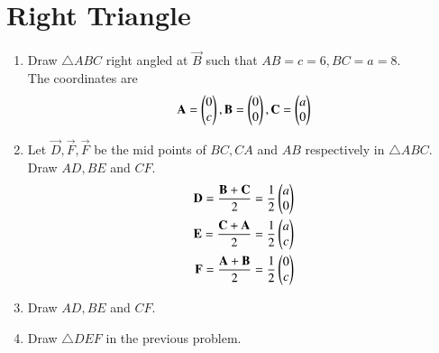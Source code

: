 \documentclass[journal,12pt,twocolumn]{IEEEtran}
\renewcommand\thesection{\arabic{section}}
\begin{document}
\section{Right Triangle}
\begin{enumerate}[label=\thesection.\arabic*
,ref=\thesection.\theenumi]
%
\item Draw $\triangle ABC$  right angled at $\vec{B}$ such that $AB = c =6, BC = a =8$.
\\
\solution The coordinates are
\begin{align}
\label{eq:rt_triang}
\mathbf{A}=\begin{pmatrix}0 \\ c\end{pmatrix}
,
\mathbf{B}=\begin{pmatrix}0 \\ 0\end{pmatrix}
,
\mathbf{C}=\begin{pmatrix}a \\ 0\end{pmatrix}
\end{align}
\item Let $\vec{D}, \vec{F}, \vec{F}$ be the mid points of $BC,CA$ and $AB$ respectively in $\triangle ABC$. Draw $AD,BE$ and $CF$.
\\
\solution 
\begin{align}
\label{eq:rt_triang_mid}
\mathbf{D} = \frac{\mathbf{B}+\mathbf{C}}{2} = \frac{1}{2}\begin{pmatrix}a \\ 0\end{pmatrix}
\\
\mathbf{E} = \frac{\mathbf{C}+\mathbf{A}}{2} = \frac{1}{2}\begin{pmatrix}a \\ c\end{pmatrix}
\\
\mathbf{F} = \frac{\mathbf{A}+\mathbf{B}}{2} = \frac{1}{2}\begin{pmatrix}0 \\ c\end{pmatrix}
\end{align}
\item  Draw $AD, BE$ and $CF$.
\item Draw $\triangle DEF$ in the previous problem.

\end{enumerate}
\end{document}
